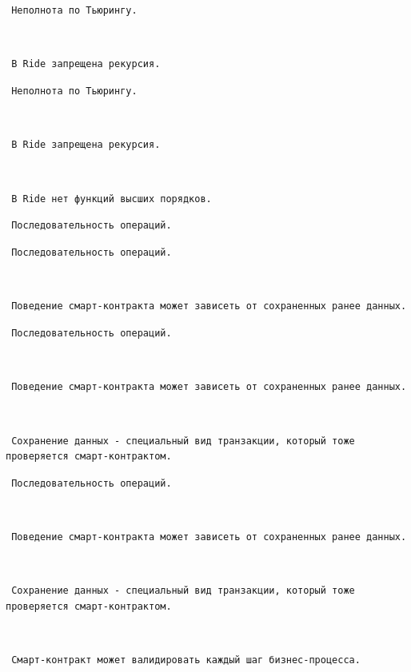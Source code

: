 \documentclass[11pt,handout,pdf,hyperref={unicode}]{beamer}
\begin{document}
\begin{frame}[fragile]

\texttt{ Неполнота по Тьюрингу. }

\texttt{ }

\texttt{ В Ride запрещена рекурсия. }

\end{frame}

\begin{frame}[fragile]

\texttt{ Неполнота по Тьюрингу. }

\texttt{ }

\texttt{ В Ride запрещена рекурсия. }

\texttt{ }

\texttt{ В Ride нет функций высших порядков. }

\end{frame}

\begin{frame}[fragile]

\texttt{ Последовательность операций. }

\end{frame}

\begin{frame}[fragile]

\texttt{ Последовательность операций. }

\texttt{ }

\texttt{ Поведение смарт-контракта может зависеть от сохраненных ранее данных. }

\end{frame}

\begin{frame}[fragile]

\texttt{ Последовательность операций. }

\texttt{ }

\texttt{ Поведение смарт-контракта может зависеть от сохраненных ранее данных. }

\texttt{ }

\texttt{ Сохранение данных - специальный вид транзакции, который тоже проверяется смарт-контрактом. }

\end{frame}

\begin{frame}[fragile]

\texttt{ Последовательность операций. }

\texttt{ }

\texttt{ Поведение смарт-контракта может зависеть от сохраненных ранее данных. }

\texttt{ }

\texttt{ Сохранение данных - специальный вид транзакции, который тоже проверяется смарт-контрактом. }

\texttt{ }

\texttt{ Смарт-контракт может валидировать каждый шаг бизнес-процесса. }

\end{frame}
\end{document}
